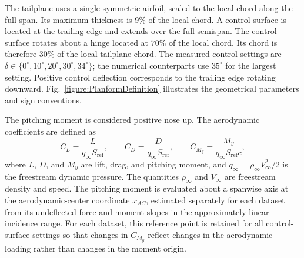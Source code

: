 \documentclass[journal ]{new-aiaa}
\begin{document}
The tailplane uses a single symmetric airfoil, scaled to the local chord along the full span.
Its maximum thickness is $9\%$ of the local chord. 
A control surface is located at the trailing edge and extends over the full semispan.
The control surface rotates about a hinge located at $70\%$ of the local chord. 
Its chord is therefore $30\%$ of the local tailplane chord.
The measured control settings are \(\delta \in \{0^\circ,10^\circ,20^\circ,30^\circ,34^\circ\}\); the numerical counterparts use \(35^\circ\) for the largest setting.
%
Positive control deflection corresponds to the trailing edge rotating downward. Fig.~\ref{figure:PlanformDefinition} illustrates the geometrical parameters and sign conventions.
%

%
The pitching moment is considered positive nose up.
%
%
%
%
%
The aerodynamic coefficients are defined as
%
\begin{equation}
C_L =
\frac{L}{q_\infty S_{\mathrm{ref}}},
\qquad
C_D =
\frac{D}{q_\infty S_{\mathrm{ref}}},
\qquad
C_{M_y} =
\frac{M_y}
{q_\infty S_{\mathrm{ref}}\bar{c}},
\label{eq:aero_coefficients}
\end{equation}
%
where $L$, $D$, and $M_y$ are lift, drag, and pitching moment, and $q_\infty=\rho_\infty V_\infty^2/2$ is the freestream dynamic pressure. The quantities $\rho_\infty$ and $V_\infty$ are freestream density and speed.
The pitching moment is evaluated about a spanwise axis at the aerodynamic-center coordinate \(x_{AC}\), estimated separately for each dataset from its undeflected force and moment slopes in the approximately linear incidence range.
For each dataset, this reference point is retained for all control-surface settings so that changes in \(C_{M_y}\) reflect changes in the aerodynamic loading rather than changes in the moment origin.
\end{document}
